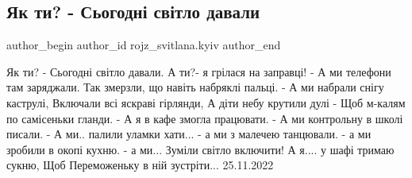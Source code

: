  
 
 
 
 
 
\subsection{Як ти? - Сьогодні світло давали}
\label{sec:25_11_2022.fb.rojz_svitlana.kyiv.1.jak_ty_svitlo_davaly}
 
\ifcmt
 author_begin
   author_id rojz_svitlana.kyiv
 author_end
\fi

\obeycr
Як ти? - Сьогодні світло давали. 
А ти?- я грілася на заправці! 
- А ми телефони там заряджали. 
Так змерзли, що навіть набряклі пальці.
- А ми набрали снігу каструлі, 
Включали всі яскраві гірлянди, 
А діти небу крутили дулі - 
Щоб м-калям по самісеньки гланди. 
- А я в кафе змогла працювати.
- А ми контрольну в школі писали.
- А ми.. палили уламки хати...
- а ми з малечею танцювали. 
- а ми зробили в окопі кухню. 
- а ми... Зуміли світло включити!
А я.... у шафі тримаю сукню, 
Щоб Переможеньку в ній зустріти...
25.11.2022
\restorecr
